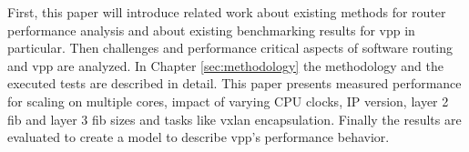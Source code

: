 
First, this paper will introduce related work about existing methods
for router performance analysis and about existing benchmarking
results for \Ac{vpp} in particular. Then challenges and performance
critical aspects of software routing and \Ac{vpp} are analyzed. In
Chapter \ref{sec:methodology} the methodology and the executed tests
are described in detail. This paper presents measured performance for
scaling on multiple cores, impact of varying CPU clocks, IP version,
layer 2 \Ac{fib} and layer 3 \Ac{fib} sizes and tasks like \Ac{vxlan}
encapsulation. Finally the results are evaluated to create a model to
describe \Ac{vpp}'s performance behavior.

